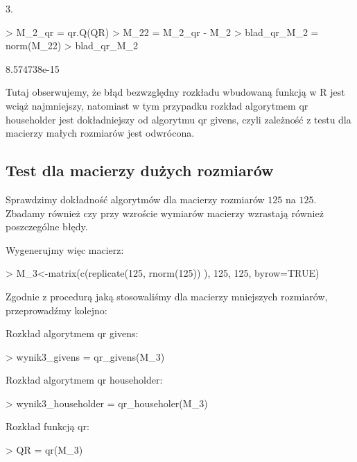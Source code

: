 \documentclass[12pt,a4paper]{report}
\begin{document}
3.
\begin{Schunk}
\begin{Sinput}
> M_2_qr = qr.Q(QR) %
> M_22 = M_2_qr - M_2
> blad_qr_M_2 = norm(M_22)
> blad_qr_M_2
\end{Sinput}
\begin{Soutput}
[1] 8.574738e-15
\end{Soutput}
\end{Schunk}


Tutaj obserwujemy, że błąd bezwzględny rozkładu wbudowaną funkcją w R jest wciąż najmniejszy, natomiast w tym przypadku rozkład algorytmem qr householder jest dokładniejszy od algorytmu qr givens, czyli zależność z testu dla macierzy małych rozmiarów jest odwrócona.

\subsection{Test dla macierzy dużych rozmiarów}

Sprawdzimy dokładność algorytmów dla macierzy rozmiarów $125$ na $125$. Zbadamy również czy przy wzroście wymiarów macierzy wzrastają również poszczególne błędy. 

Wygenerujmy więc macierz:

\begin{Schunk}
\begin{Sinput}
> M_3<-matrix(c(replicate(125, rnorm(125)) ), 125, 125, byrow=TRUE) 
\end{Sinput}
\end{Schunk}

Zgodnie z procedurą jaką stosowaliśmy dla macierzy mniejszych rozmiarów, przeprowadźmy kolejno:


Rozkład algorytmem qr givens:

\begin{Schunk}
\begin{Sinput}
> wynik3_givens = qr_givens(M_3)
\end{Sinput}
\end{Schunk}

Rozkład algorytmem qr householder:

\begin{Schunk}
\begin{Sinput}
> wynik3_householder = qr_householer(M_3)
\end{Sinput}
\end{Schunk}

Rozkład funkcją qr:

\begin{Schunk}
\begin{Sinput}
> QR = qr(M_3)
\end{Sinput}
\end{Schunk}
\end{document}
